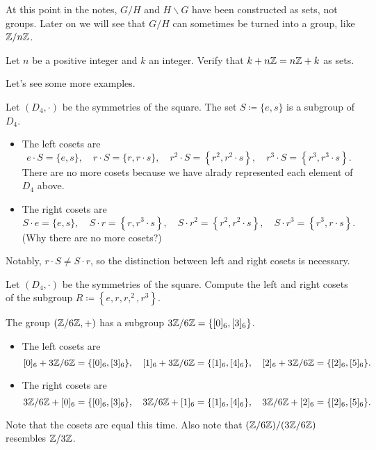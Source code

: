\documentclass[../main.tex]{subfiles}
\begin{document}
\begin{warn}
    At this point in the notes, $G/H$ and $H\backslash G$ have been constructed as sets, not groups. Later on we will see that $G/H$ can sometimes be turned into a group, like $\mathbb Z/n\mathbb Z$.
\end{warn}
\begin{exe} \label{exe:nz-is-normal}
    Let $n$ be a positive integer and $k$ an integer. Verify that $k+n\mathbb Z=n\mathbb Z+k$ as sets.
\end{exe}
Let's see some more examples.
\begin{example} \label{ex:d4-cosets}
    Let $(D_4,\cdot)$ be the symmetries of the square. The set $S\coloneqq\{e,s\}$ is a subgroup of $D_4$.
    \begin{itemize}
        \item The left cosets are
        \[e\cdot S=\{e,s\},\quad r\cdot S=\{r,r\cdot s\},\quad r^2\cdot S=\left\{r^2,r^2\cdot s\right\},\quad r^3\cdot S=\left\{r^3,r^3\cdot s\right\}.\]
        There are no more cosets because we have alrady represented each element of $D_4$ above.
        \item The right cosets are
        \[S\cdot e=\{e,s\},\quad S\cdot r=\left\{r,r^3\cdot s\right\},\quad S\cdot r^2=\left\{r^2,r^2\cdot s\right\},\quad S\cdot r^3=\left\{r^3,r\cdot s\right\}.\]
        (Why there are no more cosets?)
    \end{itemize}
    Notably, $r\cdot S\ne S\cdot r$, so the distinction between left and right cosets is necessary.
\end{example}
\begin{exe}
    Let $(D_4,\cdot)$ be the symmetries of the square. Compute the left and right cosets of the subgroup $R\coloneqq\left\{e,r,r,^2,r^3\right\}$.
\end{exe}
\begin{example} \label{ex:double-quotient}
    The group $(\mathbb Z/6\mathbb Z,+)$ has a subgroup $3\mathbb Z/6\mathbb Z=\{[0]_6,[3]_6\}$.
    \begin{itemize}
        \item The left cosets are
        \[[0]_6+3\mathbb Z/6\mathbb Z=\{[0]_6,[3]_6\},\quad[1]_6+3\mathbb Z/6\mathbb Z=\{[1]_6,[4]_6\},\quad[2]_6+3\mathbb Z/6\mathbb Z=\{[2]_6,[5]_6\}.\]
        \item The right cosets are
        \[3\mathbb Z/6\mathbb Z+[0]_6=\{[0]_6,[3]_6\},\quad3\mathbb Z/6\mathbb Z+[1]_6=\{[1]_6,[4]_6\},\quad3\mathbb Z/6\mathbb Z+[2]_6=\{[2]_6,[5]_6\}.\]
    \end{itemize}
    Note that the cosets are equal this time. Also note that $(\mathbb Z/6\mathbb Z)/(3\mathbb Z/6\mathbb Z)$ resembles $\mathbb Z/3\mathbb Z$.
\end{example}
\end{document}
